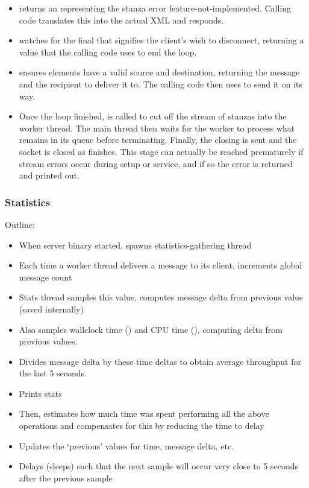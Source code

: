 \documentclass[12pt,a4paper,twoside,openright]{report}
\begin{document}
{\begin{itemize}
  \item {} returns an  representing the stanza error feature-not-implemented. Calling code translates this into the actual XML and responds.

  \item {} watches for the final  that signifies the client's wish to disconnect, returning a value that the calling code uses to end the loop.

  \item {} ensures  elements have a valid source and destination, returning the message and the recipient to deliver it to. The calling code then uses  to send it on its way.

  \item Once the loop finished,  is called to cut off the stream of stanzas into the worker thread. The main thread then waits for the worker to process what remains in its queue before terminating. Finally, the closing  is sent and the socket is closed as  finishes. This stage can actually be reached prematurely if stream errors occur during setup or service, and if so the error is returned and printed out.
\end{itemize}

\subsubsection{Statistics}
Outline:

\begin{itemize}
  \item When server binary started, spawns statistics-gathering thread
  \item Each time a worker thread delivers a message to its client, increments global message count
  \item Stats thread samples this value, computes message delta from previous value (saved internally)
  \item Also samples wallclock time () and CPU time (), computing delta from previous values.
  \item Divides message delta by these time deltas to obtain average throughput for the last 5 seconds.
  \item Prints stats
  \item Then, estimates how much time was spent performing all the above operations and compensates for this by reducing the time to delay
  \item Updates the `previous' values for time, message delta, etc.
  \item Delays (sleeps) such that the next sample will occur very close to 5 seconds after the previous sample
\end{itemize}

}
\end{document}
